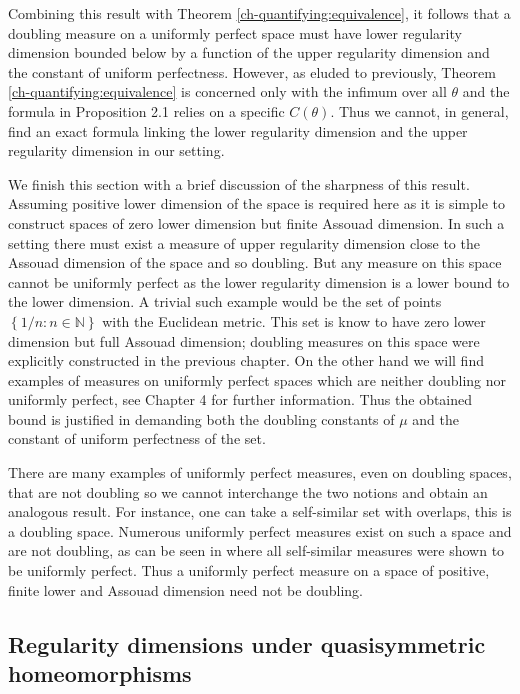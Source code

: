 Combining this result with Theorem \ref{ch-quantifying:equivalence}, it follows that a doubling measure on a uniformly perfect space must have lower regularity dimension bounded below by a function of the upper regularity dimension and the constant of uniform perfectness. However, as eluded to previously, Theorem \ref{ch-quantifying:equivalence} is concerned only with the infimum over all $\theta$ and the formula in Proposition 2.1 relies on a specific $C(\theta)$. Thus we cannot, in general, find an exact formula linking the lower regularity dimension and the upper regularity dimension in our setting.


We finish this section with a brief discussion of the sharpness of this result. Assuming positive lower dimension of the space is required here as it is simple to construct spaces of zero lower dimension but finite Assouad dimension. In such a setting there must exist a measure of upper regularity dimension close to the Assouad dimension of the space and so doubling. But any measure on this space cannot be uniformly perfect as the lower regularity dimension is a lower bound to the lower dimension. A trivial such example would be the set of points $\left\{ 1/n : n \in \mathbb{N} \right\}$ with the Euclidean metric. This set is know to have zero lower dimension but full Assouad dimension; doubling measures on this space were explicitly constructed in the previous chapter. On the other hand we will find examples of measures on uniformly perfect spaces which are neither doubling nor uniformly perfect, see Chapter 4 for further information. Thus the obtained bound is justified in demanding both the doubling constants of $\mu$ and the constant of uniform perfectness of the set.

There are many examples of uniformly perfect measures, even on doubling spaces, that are not doubling so we cannot interchange the two notions and obtain an analogous result.  For instance, one can take a self-similar set with overlaps, this is a doubling space. Numerous uniformly perfect measures exist on such a space and are not doubling, as can be seen in \cite{hare-troscheit} where all self-similar measures were shown to be uniformly perfect. Thus a uniformly perfect measure on a space of positive, finite lower and Assouad dimension need not be doubling.




\subsection{Regularity dimensions under quasisymmetric homeomorphisms}\label{ch-quantifying:sec:quasi}



